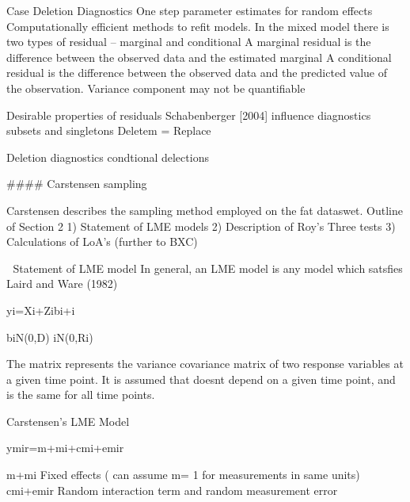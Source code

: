 Case Deletion Diagnostics
One step parameter estimates for random effects
Computationally efficient methods to refit models.
In the mixed model there is two types of residual – marginal and conditional
A marginal residual is the difference between the observed data and the estimated marginal
A conditional residual is the difference between the observed data and the predicted value of the observation.
Variance component may not be quantifiable

Desirable properties of residuals
Schabenberger [2004] influence diagnostics
subsets and singletons
Deletem = Replace

Deletion diagnostics
condtional delections


 
#### Carstensen sampling
 
Carstensen describes the sampling method employed on the fat dataswet.
Outline of Section 2
1) Statement of LME models
2) Description of Roy's Three tests
3) Calculations of LoA's (further to BXC)
 
 
Statement of LME model
In general, an LME model is any model which satsfies Laird and Ware (1982)
 
yi=Xi+Zibi+i
 
biN(0,D)
iN(0,Ri)
 
 
The matrix  represents the variance covariance matrix of two response variables at a given time point.
It is assumed that  doesnt depend on a given time point, and is the same for all time points.
 
 
Carstensen's LME Model
 
ymir=m+mi+cmi+emir
 
m+mi    Fixed effects ( can assume m= 1 for measurements in same units)
cmi+emir      Random interaction term and random measurement error 
